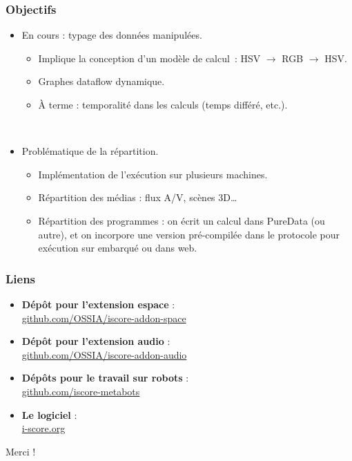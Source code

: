 \documentclass{beamer}
\begin{document}
\begin{frame}
	\frametitle{Objectifs}    
	\Large
	\begin{itemize}
		\item En cours : typage des données manipulées.
		\begin{itemize}
			\item Implique la conception d'un modèle de calcul~: HSV $\rightarrow$ RGB $\rightarrow$ HSV.
			\item Graphes dataflow dynamique.
			\item À terme : temporalité dans les calculs (temps différé, etc.).
		\end{itemize}
		~\\
		\item Problématique de la répartition.
		\begin{itemize}
			\item Implémentation de l'exécution sur plusieurs machines.
			\item Répartition des médias : flux A/V, scènes 3D\dots
			\item Répartition des programmes : on écrit un calcul dans PureData (ou autre), et on incorpore une version pré-compilée dans le protocole pour exécution sur embarqué ou dans web.
		\end{itemize}
		
	\end{itemize}
\end{frame}

\begin{frame}
    \frametitle{Liens} 
    \Large
    \begin{itemize}
        \setlength\itemsep{1em}
        \item \textbf{Dépôt pour l'extension espace} :~\\
        \url{github.com/OSSIA/iscore-addon-space}
        \item \textbf{Dépôt pour l'extension audio} :~\\
        \url{github.com/OSSIA/iscore-addon-audio}
        \item \textbf{Dépôts pour le travail sur robots} :~\\
        \url{github.com/iscore-metabots}
        \item \textbf{Le logiciel} :~\\
         \url{i-score.org}
    \end{itemize}
        
    \centering
    \vspace{2em}
    \Large{Merci !}
\end{frame}    
\end{document}
